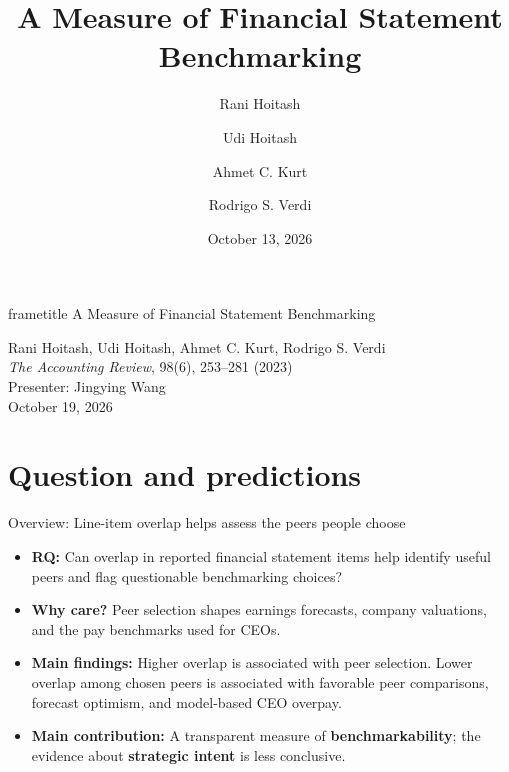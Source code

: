 \documentclass[10pt,aspectratio=169]{beamer}
\title{A Measure of Financial Statement Benchmarking}
\author{Rani Hoitash \and Udi Hoitash \and Ahmet C. Kurt \and Rodrigo S. Verdi}
\date{October 13, 2026}
\newcommand{\hi}[1]{{\color{Teal}\textbf{#1}}}
\newenvironment{bullets}{\begin{itemize}\setlength{\itemsep}{7pt}}{\end{itemize}}
\begin{document}
\begin{frame}
\vspace{6mm}
\begin{beamercolorbox}[wd=\textwidth,sep=5mm,center]{frametitle}
\Large A Measure of Financial Statement Benchmarking
\end{beamercolorbox}
\vspace{4mm}
\begin{center}
Rani Hoitash, Udi Hoitash, Ahmet C. Kurt, Rodrigo S. Verdi\\[3mm]
\small \emph{The Accounting Review}, 98(6), 253--281 (2023)\\[5mm]
\normalsize Presenter: Jingying Wang\\[2mm]
\small October 19, 2026
\end{center}
\end{frame}

\section{Question and predictions}

\begin{frame}[label=roadmap-section-1]{Overview: Line-item overlap helps assess the peers people choose}
\begin{bullets}
\item \textbf{RQ:} Can overlap in reported financial statement items help identify useful peers and flag questionable benchmarking choices?
\item \textbf{Why care?} Peer selection shapes earnings forecasts, company valuations, and the pay benchmarks used for CEOs.
\item \textbf{Main findings:} Higher overlap is associated with peer selection. Lower overlap among chosen peers is associated with favorable peer comparisons, forecast optimism, and model-based CEO overpay.
\item \textbf{Main contribution:} A transparent measure of \hi{benchmarkability}; the evidence about \hi{strategic intent} is less conclusive.
\end{bullets}

\end{frame}
\end{document}
